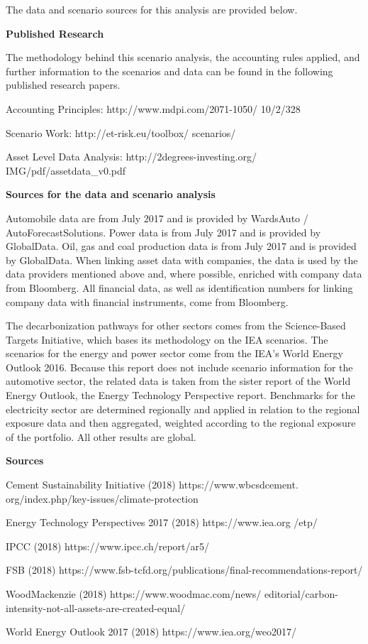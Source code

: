 \documentclass[10pt,table,a4]{article}\usepackage[]{graphicx}\usepackage[]{color}
\begin{document}
	\begin{multicols}{2}
		The data and scenario sources for this analysis are provided below. 
		
		\textbf{Published Research}
		
		The methodology behind this scenario analysis, the accounting rules applied, and further information to the scenarios and data can be found in the following published research papers. 
		
		Accounting Principles: http://www.mdpi.com/2071-1050/ 10/2/328 
		
		Scenario Work: http://et-risk.eu/toolbox/ scenarios/ 
		
		Asset Level Data Analysis: http://2degrees-investing.org/ IMG/pdf/assetdata\_v0.pdf
		
		\textbf{Sources for the data and scenario analysis}
		
		Automobile data are from July 2017 and is provided by WardsAuto / AutoForecastSolutions. Power data is from July 2017 and is provided by GlobalData. Oil, gas and coal production data is from July 2017 and is provided by GlobalData. When linking asset data with companies, the data is used by the data providers mentioned above and, where possible, enriched with company data from Bloomberg. All financial data, as well as identification numbers for linking company data with financial instruments, come from Bloomberg. 
		
		The decarbonization pathways for other sectors comes from the Science-Based Targets Initiative, which bases its methodology on the IEA scenarios. The scenarios for the energy and power sector come from the IEA's World Energy Outlook 2016. Because this report does not include scenario information for the automotive sector, the related data is taken from the sister report of the World Energy Outlook, the Energy Technology Perspective report. Benchmarks for the electricity sector are determined regionally and applied in relation to the regional exposure data and then aggregated, weighted according to the regional exposure of the portfolio. All other results are global.
		
		\textbf{Sources}
		
		Cement Sustainability Initiative (2018) https://www.wbcsdcement. org/index.php/key-issues/climate-protection
		
		Energy Technology Perspectives 2017 (2018) https://www.iea.org /etp/
		
		IPCC (2018) https://www.ipcc.ch/report/ar5/
		
		FSB (2018) https://www.fsb-tcfd.org/publications/final-recommendations-report/
		
		WoodMackenzie (2018) https://www.woodmac.com/news/ editorial/carbon-intensity-not-all-assets-are-created-equal/ 
		
		World Energy Outlook 2017 (2018) https://www.iea.org/weo2017/
	
	\end{multicols}
	
	\newpage
	
	
\end{document}
